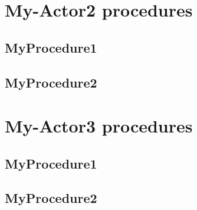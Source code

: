 \section{My-Actor2 procedures}
\subsection{MyProcedure1}
\subsection{MyProcedure2}


\section{My-Actor3 procedures}

\subsection{MyProcedure1}
\subsection{MyProcedure2}















